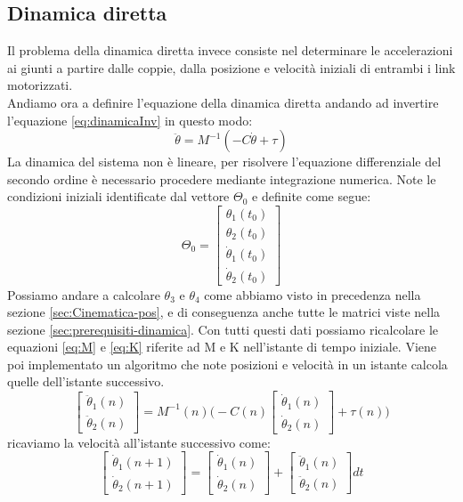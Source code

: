 \subsection{Dinamica diretta}
Il problema della dinamica diretta invece consiste nel determinare le accelerazioni ai giunti a partire dalle coppie, dalla posizione e velocità iniziali di entrambi i link motorizzati.
\\Andiamo ora a definire l'equazione della dinamica diretta andando ad invertire l'equazione \ref{eq:dinamicaInv} in questo modo:
\begin{equation}
	\ddot{\theta} = M^{-1}(-C\dot{\theta}+\tau)
	\label{eq:dinamicaDiretta}
\end{equation}
La dinamica del sistema non è lineare, per risolvere l'equazione differenziale del secondo ordine è necessario procedere mediante integrazione numerica. Note le condizioni iniziali identificate dal vettore $\Theta_0$ e definite come segue:
\begin{equation*}
    \Theta_0 = \begin{bmatrix}
    \theta_1(t_0) \\ \theta_2(t_0) \\ \dot{\theta}_1(t_0) \\ \dot{\theta}_2(t_0)
    \end{bmatrix}
\end{equation*}
Possiamo andare a calcolare $\theta_3$ e $\theta_4$ come abbiamo visto in precedenza nella sezione \ref{sec:Cinematica-pos}, e di conseguenza anche tutte le matrici viste nella sezione \ref{sec:prerequisiti-dinamica}. Con tutti questi dati possiamo  ricalcolare le equazioni \ref{eq:M} e \ref{eq:K} riferite ad M e K nell'istante di tempo iniziale. Viene poi implementato un algoritmo che note posizioni e velocità in un istante calcola quelle dell'istante successivo.
\begin{equation*}
	\begin{bmatrix}
		\ddot{\theta}_1(n) \\ \ddot{\theta}_2(n)
	\end{bmatrix} = 
 M^{-1}(n)\Bigg( -C(n)\begin{bmatrix}
 	\dot{\theta}_1(n) \\ \dot{\theta}_2(n)
 \end{bmatrix}+\tau(n)\Bigg)
\end{equation*} 
ricaviamo la velocità all'istante successivo come:
\begin{equation*}
	\begin{bmatrix}
		\dot{\theta}_1 (n+1) \\ \dot{\theta}_2(n+1)
	\end{bmatrix} = \begin{bmatrix}
	\dot{\theta}_1 (n) \\ \dot{\theta}_2(n)
\end{bmatrix} + \begin{bmatrix}
\ddot{\theta}_1 (n) \\ \ddot{\theta}_2(n)
\end{bmatrix}dt
\end{equation*} 
